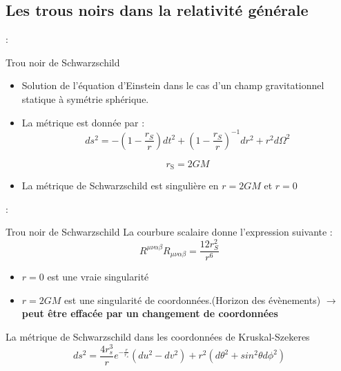 \subsection{Les trous noirs dans la  relativité générale }

\begin{frame}{\underline{\secname} : {\small \subsecname}}
\begin{block}{Trou noir de Schwarzschild}
	
	
	\begin{itemize}
		\item Solution de l'équation d'Einstein dans le
		cas d'un champ gravitationnel statique à symétrie sphérique.
		\item La métrique est donnée par :
\begin{equation*}\label{schwarzchild}
d s^{2}=-\left(1-\frac{r_{S}}{r}\right) d t^{2}+\left(1-\frac{r_{S}}{r}\right)^{-1} d r^{2}+r^{2} d \Omega^{2}
\end{equation*}

\begin{equation*}r_{\mathrm{S}}=2 G M
\end{equation*}

			\item La métrique de Schwarzschild est singulière en  $ r = 2GM$ et $ r=0$
			

	\end{itemize}
	
\end{block}
\end{frame}



\begin{frame}{\underline{\secname} : {\small \subsecname}}
\begin{block}{Trou noir de Schwarzschild}
La courbure scalaire donne l’expression suivante :
$$R^{\mu\nu\alpha\beta}R_{\mu\nu\alpha\beta}=\dfrac{12r_{S}^{2}}{r^{6}}$$
\begin{itemize}
		  \setlength\itemsep{0.5em}
	\item $r = 0$ est une vraie singularité
\item $r=2GM$ est une singularité de coordonnées.(Horizon des évènements) \pause $\rightarrow$  \textbf{peut être effacée par un changement de coordonnées}
\end{itemize}

\vspace{20pt}

\begin{block}{	La métrique de Schwarzschild dans les coordonnées de Kruskal-Szekeres}
\begin{equation*}
ds^{2}=\dfrac{4r_{s}^{3}}{r}e^{-\frac{r}{r_{s}}}(du^{2}-dv^{2})+r^{2}(d\theta^{2}+sin^{2}\theta d\phi^{2})
\end{equation*}
\end{block}



\end{block}
\end{frame}

